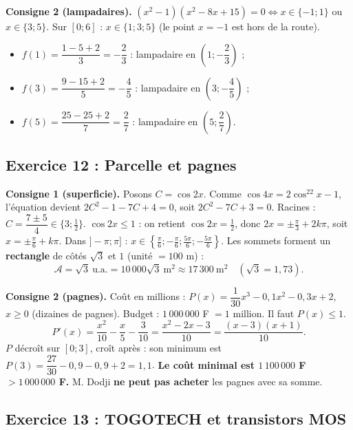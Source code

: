 \documentclass[11pt,a4paper]{article}
\begin{document}
\medskip\noindent\textbf{Consigne 2 (lampadaires).} $(x^2-1)(x^2-8x+15)=0\iff x\in\{-1;1\}$ ou $x\in\{3;5\}$.
Sur $[0;6]$ : $x\in\{1;3;5\}$ (le point $x=-1$ est hors de la route).
\begin{itemize}
  \item $f(1)=\dfrac{1-5+2}{3}=-\dfrac23$ : lampadaire en $\left(1;-\dfrac23\right)$ ;
  \item $f(3)=\dfrac{9-15+2}{5}=-\dfrac45$ : lampadaire en $\left(3;-\dfrac45\right)$ ;
  \item $f(5)=\dfrac{25-25+2}{7}=\dfrac27$ : lampadaire en $\left(5;\dfrac27\right)$.
\end{itemize}

\subsection{Exercice 12 : Parcelle et pagnes}

\textbf{Consigne 1 (superficie).} Posons $C=\cos2x$. Comme $\cos4x=2\cos^22x-1$, l'\'equation devient
$2C^2-1-7C+4=0$, soit $2C^2-7C+3=0$. Racines : $C=\dfrac{7\pm5}{4}\in\{3;\tfrac12\}$.
$\cos2x\le1$ : on retient $\cos2x=\frac12$, donc $2x=\pm\frac{\pi}{3}+2k\pi$, soit $x=\pm\frac{\pi}{6}+k\pi$.
Dans $]-\pi;\pi]$ : $x\in\left\{\frac{\pi}{6};-\frac{\pi}{6};\frac{5\pi}{6};-\frac{5\pi}{6}\right\}$.
Les sommets forment un \textbf{rectangle} de c\^ot\'es $\sqrt3$ et $1$ (unit\'e $=100$ m) :
\[
\mathcal A=\sqrt3\ \text{u.a.}=10\,000\sqrt3\ \text{m}^2\approx 17\,300\ \text{m}^2\quad(\sqrt3=1{,}73).
\]

\textbf{Consigne 2 (pagnes).} Co\^ut en millions : $P(x)=\dfrac{1}{30}x^3-0{,}1x^2-0{,}3x+2$, $x\ge0$ (dizaines de pagnes).
Budget : $1\,000\,000$ F $=1$ million. Il faut $P(x)\le1$.
\[
P'(x)=\frac{x^2}{10}-\frac{x}{5}-\frac{3}{10}=\frac{x^2-2x-3}{10}=\frac{(x-3)(x+1)}{10}.
\]
$P$ d\'ecro\^it sur $[0;3]$, cro\^it apr\`es : son minimum est $P(3)=\dfrac{27}{30}-0{,}9-0{,}9+2=1{,}1$.
\textbf{Le co\^ut minimal est $1\,100\,000$ F $>1\,000\,000$ F.} M. Dodji \textbf{ne peut pas acheter} les pagnes avec sa somme.

\subsection{Exercice 13 : TOGOTECH et transistors MOS}
\end{document}

